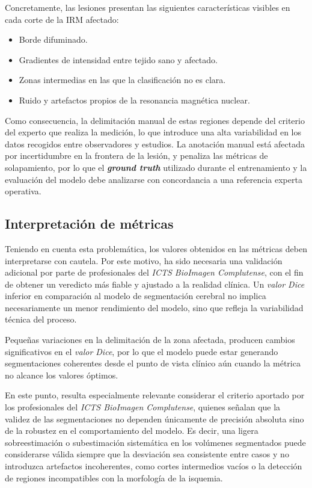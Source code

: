 Concretamente, las lesiones presentan las siguientes características visibles en cada corte de la IRM afectado:
 \begin{itemize}
    \item Borde difuminado.
    \item Gradientes de intensidad entre tejido sano y afectado.
    \item Zonas intermedias en las que la clasificación no es clara.
    \item Ruido y artefactos propios de la resonancia magnética nuclear.
\end{itemize}
Como consecuencia, la delimitación manual de estas regiones depende del criterio del experto que realiza la medición, lo que introduce una alta variabilidad en los datos recogidos entre observadores y estudios.
La anotación manual está afectada por incertidumbre en la frontera de la lesión, y penaliza las métricas de solapamiento, por lo que el\textbf{ \textit{ground truth}} utilizado durante el entrenamiento y la evaluación del modelo debe analizarse con concordancia a una referencia experta operativa.

\subsection{Interpretación de métricas}
Teniendo en cuenta esta problemática, los valores obtenidos en las métricas deben interpretarse con cautela. Por este motivo, ha sido necesaria una validación adicional por parte de profesionales del \textit{ ICTS BioImagen Complutense}, con el fin de obtener un veredicto más fiable y ajustado a la realidad clínica. Un \textit{valor Dice} inferior en comparación al modelo de segmentación cerebral no implica necesariamente un menor rendimiento del modelo, sino que refleja la variabilidad técnica del proceso.

Pequeñas variaciones en la delimitación de la zona afectada, producen cambios significativos en el \textit{valor Dice}, por lo que el modelo puede estar generando segmentaciones coherentes desde el punto de vista clínico aún cuando la métrica no alcance los valores óptimos.

En este punto, resulta especialmente relevante considerar el criterio aportado por los profesionales del\textit{  ICTS BioImagen Complutense}, quienes señalan que la validez de las segmentaciones no dependen únicamente de precisión absoluta sino de la robustez en el comportamiento del modelo. Es decir, una ligera sobreestimación o subestimación sistemática en los volúmenes segmentados puede considerarse válida siempre que la desviación sea consistente entre casos y no introduzca artefactos incoherentes, como cortes intermedios vacíos o la detección de regiones incompatibles con la morfología de la isquemia. 

